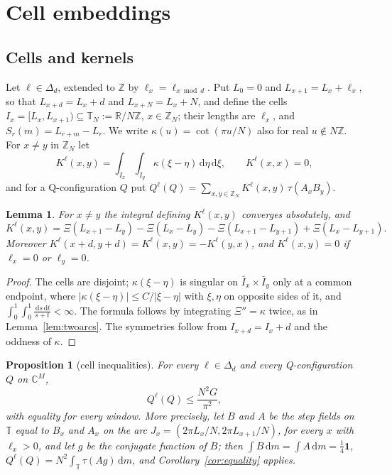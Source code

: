 \documentclass[11pt]{amsart}
\newtheorem{lemma}[theorem]{Lemma}
\newtheorem{proposition}[theorem]{Proposition}
\theoremstyle{definition}
\theoremstyle{remark}
\numberwithin{equation}{section}
\newcommand{\Z}{\mathbb{Z}}
\newcommand{\R}{\mathbb{R}}
\newcommand{\C}{\mathbb{C}}
\newcommand{\T}{\mathbb{T}}
\newcommand{\one}{\mathbf{1}}
\newcommand{\dd}{\,\mathrm{d}}
\begin{document}
\section{Cell embeddings}\label{sec:cells}

\subsection{Cells and kernels}
Let $\ell\in\Delta_d$, extended to $\Z$ by $\ell_x=\ell_{x\bmod d}$. Put $L_0=0$ and $L_{x+1}=L_x+\ell_x$, so that
$L_{x+d}=L_x+d$ and $L_{x+N}=L_x+N$, and define the cells $I_x=[L_x,L_{x+1})\subseteq\T_N:=\R/N\Z$, $x\in\Z_N$; their lengths
are $\ell_x$, and $S_r(m)=L_{r+m}-L_r$. We write $\kappa(u)=\cot(\pi u/N)$ also for real $u\notin N\Z$. For $x\ne y$ in $\Z_N$
let
\[
K^\ell(x,y)=\int_{I_x}\int_{I_y}\kappa(\xi-\eta)\dd\eta\dd\xi ,\qquad K^\ell(x,x)=0,
\]
and for a Q-configuration $Q$ put $Q^\ell(Q)=\sum_{x,y\in\Z_N}K^\ell(x,y)\,\tau(A_xB_y)$.

\begin{lemma}\label{lem:kernel}
For $x\ne y$ the integral defining $K^\ell(x,y)$ converges absolutely, and
\[
K^\ell(x,y)=\Xi(L_{x+1}-L_y)-\Xi(L_x-L_y)-\Xi(L_{x+1}-L_{y+1})+\Xi(L_x-L_{y+1}).
\]
Moreover $K^\ell(x+d,y+d)=K^\ell(x,y)=-K^\ell(y,x)$, and $K^\ell(x,y)=0$ if $\ell_x=0$ or $\ell_y=0$.
\end{lemma}

\begin{proof}
The cells are disjoint; $\kappa(\xi-\eta)$ is singular on $\bar I_x\times\bar I_y$ only at a common endpoint, where
$|\kappa(\xi-\eta)|\le C/|\xi-\eta|$ with $\xi,\eta$ on opposite sides of it, and
$\int_0^1\int_0^1\frac{\dd s\dd t}{s+t}<\infty$. The formula follows by integrating $\Xi''=\kappa$ twice, as in
Lemma~\ref{lem:twoarcs}. The symmetries follow from $I_{x+d}=I_x+d$ and the oddness of $\kappa$.
\end{proof}

\begin{proposition}[cell inequalities]\label{prop:cellineq}
For every $\ell\in\Delta_d$ and every Q-configuration $Q$ on $\C^M$,
\[
Q^\ell(Q)\le\frac{N^2G}{\pi^2},
\]
with equality for every window. More precisely, let $B$ and $A$ be the step fields on $\T$ equal to $B_x$ and $A_x$ on the
arc $J_x=(2\pi L_x/N,2\pi L_{x+1}/N)$, for every $x$ with $\ell_x>0$, and let $g$ be the conjugate function of $B$; then
$\int B\dd m=\int A\dd m=\frac14\one$, $Q^\ell(Q)=N^2\int_\T\tau(Ag)\dd m$, and Corollary~\ref{cor:equality} applies.
\end{proposition}
\end{document}
